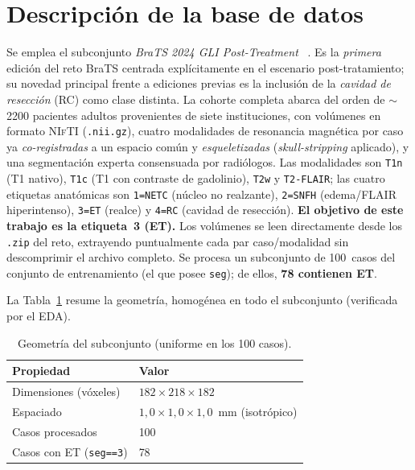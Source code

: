 \documentclass[conference]{IEEEtran}
\begin{document}
\section{Descripción de la base de datos}
Se emplea el subconjunto \textit{BraTS 2024 GLI Post-Treatment}
~\cite{deverdier2024brats}. Es la \emph{primera} edición del reto
BraTS centrada explícitamente en el escenario post-tratamiento;
su novedad principal frente a ediciones previas es la inclusión
de la \emph{cavidad de resección} (RC) como clase distinta. La
cohorte completa abarca del orden de $\sim$2200 pacientes
adultos provenientes de siete instituciones, con volúmenes en
formato \textsc{NIfTI} (\texttt{.nii.gz}), cuatro modalidades de
resonancia magnética por caso ya \emph{co-registradas} a un
espacio común y \emph{esqueletizadas} (\textit{skull-stripping}
aplicado), y una segmentación experta consensuada por
radiólogos. Las modalidades son \texttt{T1n} (T1 nativo),
\texttt{T1c} (T1 con contraste de gadolinio), \texttt{T2w} y
\texttt{T2-FLAIR}; las cuatro etiquetas anatómicas son
\texttt{1=NETC} (núcleo no realzante), \texttt{2=SNFH}
(edema/FLAIR hiperintenso), \texttt{3=ET} (realce) y \texttt{4=RC}
(cavidad de resección). \textbf{El objetivo de este trabajo es la
etiqueta~3 (ET).} Los volúmenes se leen directamente desde los
\texttt{.zip} del reto, extrayendo puntualmente cada par
caso/modalidad sin descomprimir el archivo completo. Se procesa un
subconjunto de 100~casos del conjunto de entrenamiento (el que
posee \texttt{seg}); de ellos, \textbf{78 contienen ET}.

La Tabla~\ref{tab:geometria} resume la geometría, homogénea en
todo el subconjunto (verificada por el EDA).

\begin{table}[h]
\centering
\caption{Geometría del subconjunto (uniforme en los 100 casos).}
\label{tab:geometria}
\begin{tabular}{ll}
\toprule
Propiedad & Valor \\
\midrule
Dimensiones (vóxeles) & $182 \times 218 \times 182$ \\
Espaciado & $1{,}0 \times 1{,}0 \times 1{,}0$~mm (isotrópico) \\
Casos procesados & 100 \\
Casos con ET (\texttt{seg==3}) & 78 \\
\bottomrule
\end{tabular}
\end{table}
\end{document}
